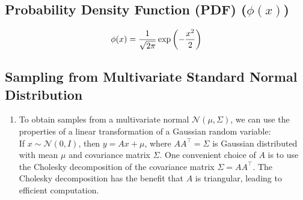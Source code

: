 \subsection{Probability Density Function (PDF) ($\phi(x)$) \cite{ism-1}} \label{Standard Normal Distribution: PDF}

\[
    \phi(x)
    = \dfrac{1}{\sqrt{2\pi}}\exp\left(-\dfrac{x^2}{2}\right)
\]


\subsection{Sampling from Multivariate Standard Normal Distribution \cite{mfml-1}} \label{Sampling from Multivariate Standard Normal Distribution}

\begin{enumerate}
    \item To obtain samples from a multivariate normal $\mathcal{N} (\mu , \Sigma )$, we can use the properties of a linear transformation of a Gaussian random variable: \\
    If $x \sim \mathcal{N} (0, I)$, then $y = Ax + \mu $, where $AA^\top  = \Sigma $ is Gaussian distributed with mean $\mu $ and covariance matrix $\Sigma $. One convenient choice of $A$ is to use the Cholesky decomposition of the covariance matrix $\Sigma  = AA^\top $. The Cholesky decomposition has the benefit that $A$ is triangular, leading to efficient computation.
\end{enumerate}
































